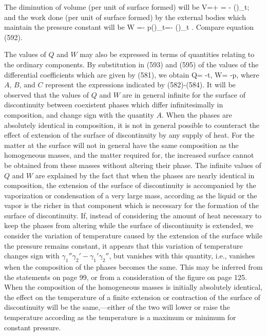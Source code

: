 \documentclass[12pt]{memoir}
\begin{document}
{The diminution of volume (per unit of surface formed) will be
\eqs V=+ = - \left(\right)_t;  \label{594} \eqe
and the work done (per unit of surface formed) by the external
bodies which maintain the pressure constant will be
\eqs W =- p\left(\right)_t=- \left(\right)_t . \label{595} \eqe
Compare equation (592).

The values of $Q$ and $W$ may also be expressed in terms of quantities relating to the ordinary components. By substitution in (593) and (595) of the values of the differential coefficients which are given by (581), we obtain
\eqs Q= -t,  \quad  W= -p,  \label{596} \eqe
where $A$, $B$, and $C$ represent the expressions indicated by (582)-(584). It will be observed that the values of $Q$ and $W$ are in general infinite for the surface of discontinuity between coexistent phases which differ infinitesimally in composition, and change sign with the quantity $A$. When the phases are absolutely identical in composition, it is not in general possible to counteract the effect of extension of the surface of discontinuity by any supply of heat. For the matter at the surface will not in general have the same composition as the homogeneous masses, and the matter required for, the increased surface cannot be obtained from these masses without altering their phase. The infinite values of $Q$ and $W$ are explained by the fact that when the phases are nearly identical in composition, the extension of the surface of discontinuity is accompanied by the vaporization or condensation of a very large mass, according as the liquid or the vapor is the richer in that component which is necessary for the formation of the surface of discontinuity.
If, instead of considering the amount of heat necessary to keep the phases from altering while the surface of discontinuity is extended, we consider the variation of temperature caused by the extension of the surface while the pressure remains constant, it appears that this variation  of temperature changes sign with $\gamma_1''\gamma_2'- \gamma_1'\gamma_2''$, but vanishes with this quantity, i.e., vanishes when the composition of the phases becomes the same. This may be inferred from the statements on page 99, or from a consideration of the figure on page 125. When the composition of the homogeneous masses is initially absolutely identical, the effect on the temperature of a finite extension or contraction of the surface of discontinuity will be the same,---either of the two will lower or raise the temperature according as the temperature is a maximum or minimum for constant pressure.



}
\end{document}
